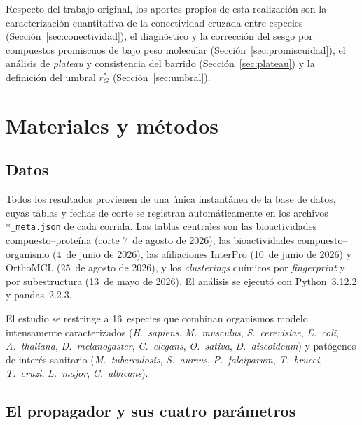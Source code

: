 \documentclass[11pt,a4paper]{article}
\newcommand{\rGe}{r_{G}^{\ast}}
\newcommand{\spn}[1]{\textit{#1}}
\begin{document}
Respecto del trabajo original, los aportes propios de esta realización son la
caracterización cuantitativa de la conectividad cruzada entre especies
(Sección~\ref{sec:conectividad}), el diagnóstico y la corrección del sesgo por
compuestos promiscuos de bajo peso molecular (Sección~\ref{sec:promiscuidad}),
el análisis de \emph{plateau} y consistencia del barrido
(Sección~\ref{sec:plateau}) y la definición del umbral $\rGe$
(Sección~\ref{sec:umbral}).

\section{Materiales y métodos}

\subsection{Datos}

Todos los resultados provienen de una única instantánea de la base de datos,
cuyas tablas y fechas de corte se registran automáticamente en los archivos
\texttt{*\_meta.json} de cada corrida. Las tablas centrales son las
bioactividades compuesto--proteína (corte 7~de agosto de 2026), las
bioactividades compuesto--organismo (4~de junio de 2026), las afiliaciones
InterPro \citep{interpro} (10~de junio de 2026) y OrthoMCL \citep{orthomcl}
(25~de agosto de 2026), y los \emph{clusterings} químicos por
\emph{fingerprint} \citep{rogers2010} y por subestructura (13~de mayo de 2026).
El análisis se ejecutó con Python~3.12.2 y pandas~2.2.3.

El estudio se restringe a 16~especies que combinan organismos modelo
intensamente caracterizados (\spn{H.~sapiens}, \spn{M.~musculus},
\spn{S.~cerevisiae}, \spn{E.~coli}, \spn{A.~thaliana}, \spn{D.~melanogaster},
\spn{C.~elegans}, \spn{O.~sativa}, \spn{D.~discoideum}) y patógenos de interés
sanitario (\spn{M.~tuberculosis}, \spn{S.~aureus}, \spn{P.~falciparum},
\spn{T.~brucei}, \spn{T.~cruzi}, \spn{L.~major}, \spn{C.~albicans}).

\subsection{El propagador y sus cuatro parámetros}
\label{sec:metodo}
\end{document}
